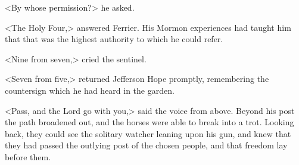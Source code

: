 <By whose permission?> he asked.

<The Holy Four,> answered Ferrier. His Mormon experiences had taught him that that was the highest authority to which he could refer.

<Nine from seven,> cried the sentinel.

<Seven from five,> returned Jefferson Hope promptly, remembering the countersign which he had heard in the garden.

<Pass, and the Lord go with you,> said the voice from above. Beyond his post the path broadened out, and the horses were able to break into a trot. Looking back, they could see the solitary watcher leaning upon his gun, and knew that they had passed the outlying post of the chosen people, and that freedom lay before them.